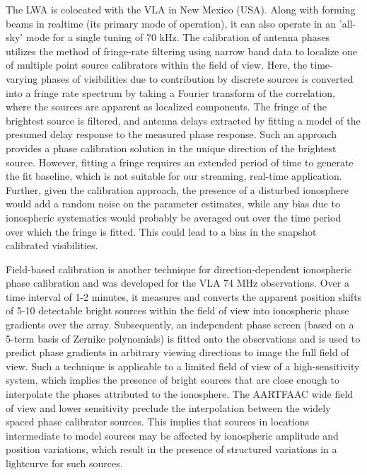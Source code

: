 \documentclass{aa}
\begin{document}
The  LWA  \citep{ellingsonLWA1}  is  colocated  with  the  VLA  in  New  Mexico
(USA). Along with forming beams in realtime (its primary mode of operation), it
can  also operate  in an  'all-sky' mode  for a  single tuning  of 70  kHz.  The
calibration of antenna phases utilizes the method of fringe-rate filtering using
narrow band data to localize one of multiple point source calibrators within the
field of view. Here, the time-varying phases of visibilities due to contribution
by discrete sources is converted into a fringe rate spectrum by taking a Fourier
transform  of the  correlation,  where  the sources  are  apparent as  localized
components. The fringe  of the brightest source is  filtered, and antenna delays
extracted by  fitting a  model of  the presumed delay  response to  the measured
phase response.  Such  an approach provides a phase  calibration solution in the
unique direction of the brightest source.  However, fitting a fringe requires an
extended period of time to generate  the fit baseline, which is not suitable for
our streaming, real-time application.   Further, given the calibration approach,
the presence of a disturbed ionosphere would add a random noise on the parameter
estimates,  while any  bias due  to  ionospheric systematics  would probably  be
averaged out  over the time period over  which the fringe is  fitted. This could
lead to a bias in the snapshot calibrated visibilities.

Field-based  calibration  \citep{cottona2004beyond}  is  another  technique  for
direction-dependent ionospheric phase calibration  and was developed for the VLA
74  MHz observations.   Over a  time interval  of 1-2  minutes, it  measures and
converts the apparent  position shifts of 5-10 detectable  bright sources within
the field of view into ionospheric phase gradients over the array. Subsequently,
an independent phase screen (based on  a 5-term basis of Zernike polynomials) is
fitted onto the observations and is used to predict phase gradients in arbitrary
viewing  directions to  image  the full  field  of view.   Such  a technique  is
applicable  to a  limited  field of  view  of a  high-sensitivity system,  which
implies the presence of bright sources  that are close enough to interpolate the
phases attributed to  the ionosphere. The AARTFAAC wide field  of view and lower
sensitivity  preclude   the  interpolation  between  the   widely  spaced  phase
calibrator  sources.  This  implies that  sources in  locations  intermediate to
model sources may be affected  by ionospheric amplitude and position variations,
which result in  the presence of structured variations in  a lightcurve for such
sources. %
\end{document}
